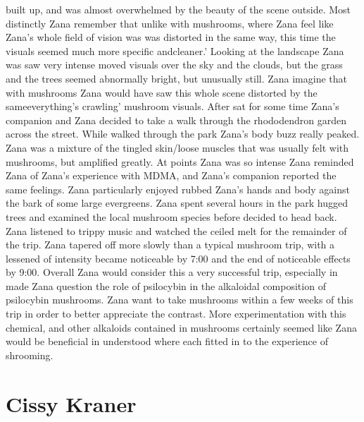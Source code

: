 \documentclass[12pt]{book}
\begin{document}
built up, and was almost overwhelmed by the beauty of the scene outside. Most distinctly Zana remember that unlike with mushrooms, where Zana feel like Zana's whole field of vision was was distorted in the same way, this time the visuals seemed much more specific andcleaner.' Looking at the landscape Zana was saw very intense moved visuals over the sky and the clouds, but the grass and the trees seemed abnormally bright, but unusually still. Zana imagine that with mushrooms Zana would have saw this whole scene distorted by the sameeverything's crawling' mushroom visuals. After sat for some time Zana's companion and Zana decided to take a walk through the rhododendron garden across the street. While walked through the park Zana's body buzz really peaked. Zana was a mixture of the tingled skin/loose muscles that was usually felt with mushrooms, but amplified greatly. At points Zana was so intense Zana reminded Zana of Zana's experience with MDMA, and Zana's companion reported the same feelings. Zana particularly enjoyed rubbed Zana's hands and body against the bark of some large evergreens. Zana spent several hours in the park hugged trees and examined the local mushroom species before decided to head back. Zana listened to trippy music and watched the ceiled melt for the remainder of the trip. Zana tapered off more slowly than a typical mushroom trip, with a lessened of intensity became noticeable by 7:00 and the end of noticeable effects by 9:00. Overall Zana would consider this a very successful trip, especially in made Zana question the role of psilocybin in the alkaloidal composition of psilocybin mushrooms. Zana want to take mushrooms within a few weeks of this trip in order to better appreciate the contrast. More experimentation with this chemical, and other alkaloids contained in mushrooms certainly seemed like Zana would be beneficial in understood where each fitted in to the experience of shrooming.



\chapter{Cissy Kraner}
\end{document}
